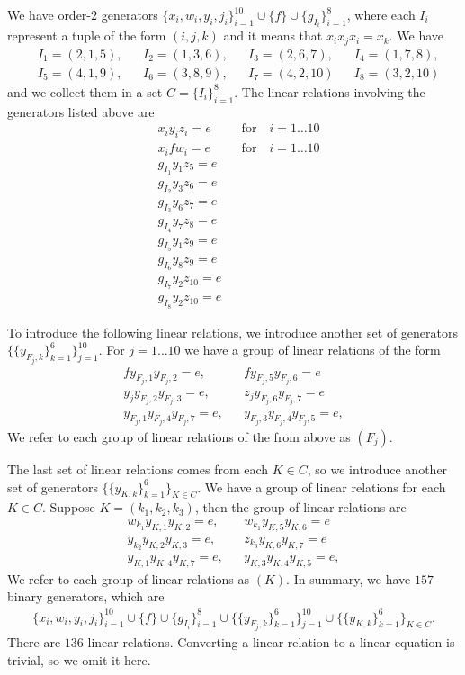 We have order-$2$ generators $\{x_i, w_i, y_i, j_i\}_{i=1}^{10} \cup \{f\} \cup \{g_{I_i}\}_{i=1}^8$,
where each $I_i$ represent a tuple of the form $(i,j,k)$ and it means that $x_ix_jx_i = x_k$.
We have 
\begin{align*}
	&I_1 = (2,1,5), 
	&&I_2 = (1,3,6), 
	&&I_3 = (2,6,7), 
	&&I_4 = (1,7,8), \\
	&I_5 = (4,1,9),
	&&I_6 = (3,8,9),
	&&I_7 = (4,2,10)
	&&I_8 = (3,2,10)
\end{align*}
and we collect them in a set $C = \{ I_i \}_{i=1}^8$. 
The linear relations involving the generators listed above are
\begin{align}
	\label{eq:xyz} &x_i y_i z_i = e  &&\text{for} \quad i =1\dots 10 \\
	\label{eq:xfw} &x_i f w_i = e   &&\text{for} \quad i =1\dots 10 \\
	&g_{I_1} y_1z_5 =e \\
	&g_{I_2} y_3z_6 =e \\
	&g_{I_3} y_6z_7 =e \\
	&g_{I_4} y_7z_8 =e \\
	&g_{I_5} y_1z_9 =e \\
	&g_{I_6} y_8z_9 = e\\
	&g_{I_7} y_2z_{10} =e \\
	&g_{I_8} y_2z_{10} = e
\end{align}

To introduce the following linear relations, we introduce another set of 
generators $\{\{y_{F_j,k}\}_{k=1}^6\}_{j=1}^{10}$.
For $j =1 \dots 10$ we have a group of linear relations of the form
\begin{align}
	f y_{F_j,1} y _{F_j,2} = e, && f y_{F_j,5} y_{F_j,6} = e \\
	y_j y_{F_j,2} y _{F_j,3} = e, && z_j y_{F_j,6} y_{F_j,7} = e \\
	y_{F_j,1} y_{F_j,4} y _{F_j,7} = e, && y_{F_j,3} y_{F_j,4} y_{F_j,5} = e,
\end{align}
We refer to each group of linear relations of the from above as $(F_j)$.

The last set of linear relations comes from each $K \in C$, 
so we introduce another set of generators $\{\{y_{K,k}\}_{k=1}^6\}_{K \in C}$.
We have a group of linear relations for each $K \in C$.
Suppose $K = (k_1,k_2,k_3)$, then the group of linear relations are
\begin{align}
	w_{k_1} y_{K,1} y _{K,2} = e, && w_{k_1} y_{K,5} y_{K,6} = e \\
	y_{k_2} y_{K,2} y _{K,3} = e, && z_{k_3} y_{K,6} y_{K,7} = e \\
	y_{K,1} y_{K,4} y _{K,7} = e, && y_{K,3} y_{K,4} y_{K,5} = e,
\end{align}
We refer to each group of linear relations as $(K)$.
In summary, we have $157$ binary generators, which are
\begin{align}
\{x_i, w_i, y_i, j_i\}_{i=1}^{10} \cup \{f\} \cup \{g_{I_i}\}_{i=1}^8\cup\{\{y_{F_j,k}\}_{k=1}^6\}_{j=1}^{10}
\cup \{\{y_{K,k}\}_{k=1}^6\}_{K \in C}.
\end{align}
There are $136$ linear relations.
Converting a linear relation to a linear equation is trivial, so we omit it here.

